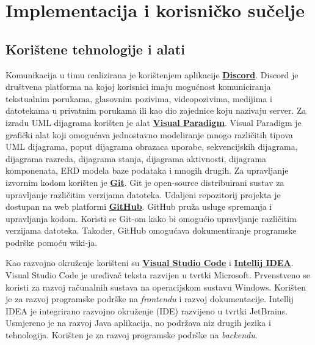 \chapter{Implementacija i korisničko sučelje}
		
		
		\section{Korištene tehnologije i alati}
		
			 Komunikacija u timu realizirana je korištenjem aplikacije \textbf{\href{https://discord.com/}{Discord}}. 
			 Discord je društvena platforma na kojoj korisnici imaju mogućnost komuniciranja tekstualnim porukama, glasovnim
			 pozivima, videopozivima, medijima i datotekama u privatnim porukama ili kao dio zajednice koju nazivaju server. 
			 Za izradu UML dijagrama korišten je alat \textbf{\href{https://www.visual-paradigm.com/}{Visual Paradigm}}. Visual 
			 Paradigm je grafički alat koji omogućava jednostavno modeliranje mnogo različitih tipova UML dijagrama, poput 
			 dijagrama obrazaca uporabe, sekvencijskih dijagrama, dijagrama razreda, dijagrama stanja, dijagrama aktivnosti, 
			 dijagrama komponenata, ERD modela baze podataka i mnogih drugih. Za upravljanje izvornim kodom korišten je 
			 \textbf{\href{https://git-scm.com/}{Git}}. Git je open-source distribuirani sustav za upravljanje različitim 
			 verzijama datoteka. Udaljeni repozitorij projekta je dostupan na web platformi \textbf{\href{https://github.com/}{GitHub}}.
			 GitHub pruža usluge spremanja i upravljanja kodom. Koristi se Git-om kako bi omogućio upravljanje različitim 
			 verzijama datoteka. Također, GitHub omogućava dokumentiranje programske podrške pomoću wiki-ja.

			 Kao razvojno okruženje korišteni su \textbf{\href{https://code.visualstudio.com/}{Visual Studio Code}} 
			 i \textbf{\href{https://www.jetbrains.com/idea//}{Intellij IDEA}}. Visual Studio Code je uređivač teksta
			 razvijen u tvrtki Microsoft. Prvenstveno se koristi za razvoj računalnih sustava na operacijskom sustavu Windows. 
			 Korišten je za razvoj programske podrške na \textit{frontendu} i razvoj dokumentacije. Intellij IDEA je integrirano razvojno 
			 okruženje (IDE) razvijeno u tvrtki JetBrains. Usmjereno je na razvoj Java aplikacija, no podržava niz drugih jezika i 
			 tehnologija. Korišten je za razvoj programske podrške na \textit{backendu}.


